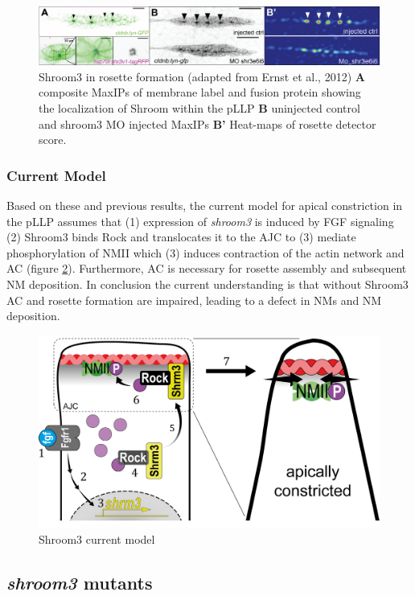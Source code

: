 \documentclass[11pt,singlespacinge,twoside]{reedthesis} %
\theoremstyle{definition}
\theoremstyle{definition}
\theoremstyle{definition}
\theoremstyle{remark}
\begin{document}
\begin{figure}

{\centering \includegraphics[width=0.95\linewidth]{figures/intro/shrm_ernst} 

}

\caption[Shroom3 in rosette formation]{Shroom3 in rosette formation (adapted from Ernst et al., 2012) \textbf{A} composite MaxIPs of membrane label and fusion protein showing the localization of Shroom within the pLLP \textbf{B} uninjected control and shroom3 MO injected MaxIPs \textbf{B'} Heat-maps of rosette detector score.}\label{fig:shrmernst}
\end{figure}
\hypertarget{current-model}{%
\subsubsection{Current Model}\label{current-model}}

Based on these and previous results, the current model for apical constriction in the pLLP assumes that (1) expression of \emph{shroom3} is induced by FGF signaling (2) Shroom3 binds Rock and translocates it to the AJC to (3) mediate phosphorylation of NMII which (3) induces contraction of the actin network and AC (figure \ref{fig:shrmmodel}). Furthermore, AC is necessary for rosette assembly and subsequent NM deposition. In conclusion the current understanding is that without Shroom3 AC and rosette formation are impaired, leading to a defect in NMs and NM deposition.


\begin{figure}[h]

{\centering \includegraphics[width=0.5\linewidth,]{figures/intro/shrm_model} 

}

\caption{Shroom3 current model}\label{fig:shrmmodel}
\end{figure}
\hypertarget{shroom3-mutants}{%
\subsection{\texorpdfstring{\emph{shroom3} mutants}{shroom3 mutants}}\label{shroom3-mutants}}
\end{document}
